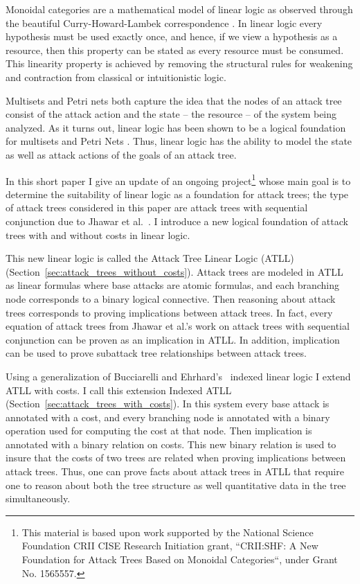 \documentclass{llncs}
\begin{document}
Monoidal categories are a mathematical model of linear logic as
observed through the beautiful Curry-Howard-Lambek correspondence
\cite{Mellies:2009}.  In linear logic every hypothesis must be used
exactly once, and hence, if we view a hypothesis as a resource, then
this property can be stated as every resource must be consumed.  This
linearity property is achieved by removing the structural rules for
weakening and contraction from classical or intuitionistic logic.

Multisets and Petri nets both capture the idea that the nodes of an
attack tree consist of the attack action and the state -- the
resource -- of the system being analyzed. As it turns out, linear
logic has been shown to be a logical foundation for multisets
\cite{Tzouvaras:1998} and Petri Nets \cite{Brown:1991}.  Thus, linear
logic has the ability to model the state as well as attack actions of
the goals of an attack tree.  

In this short paper I give an update of an ongoing
project\footnote{This material is based upon work supported by the
  National Science Foundation CRII CISE Research Initiation grant,
  ``CRII:SHF: A New Foundation for Attack Trees Based on Monoidal
  Categories``, under Grant No. 1565557.} whose main goal is to
determine the suitability of linear logic as a foundation for attack
trees; the type of attack trees considered in this paper are attack
trees with sequential conjunction due to Jhawar et
al.~\cite{Jhawar:2015}.  I introduce a new logical foundation of
attack trees with and without costs in linear logic.

This new linear logic is called the Attack Tree Linear Logic (ATLL)
(Section~\ref{sec:attack_trees_without_costs}).  Attack trees are
modeled in ATLL as linear formulas where base attacks are atomic
formulas, and each branching node corresponds to a binary logical
connective. Then reasoning about attack trees corresponds to proving
implications between attack trees.  In fact, every equation of attack
trees from Jhawar et al.'s work on attack trees with sequential
conjunction \cite{Jhawar:2015} can be proven as an implication in
ATLL.  In addition, implication can be used to prove subattack tree
relationships between attack trees.

Using a generalization of Bucciarelli and Ehrhard’s~\cite{?} indexed
linear logic I extend ATLL with costs.  I call this extension Indexed
ATLL (Section~\ref{sec:attack_trees_with_costs}).  In this system
every base attack is annotated with a cost, and every branching node
is annotated with a binary operation used for computing the cost at
that node.  Then implication is annotated with a binary relation on
costs.  This new binary relation is used to insure that the costs of
two trees are related when proving implications between attack trees.
Thus, one can prove facts about attack trees in ATLL that require one
to reason about both the tree structure as well quantitative data in
the tree simultaneously.
\end{document}
